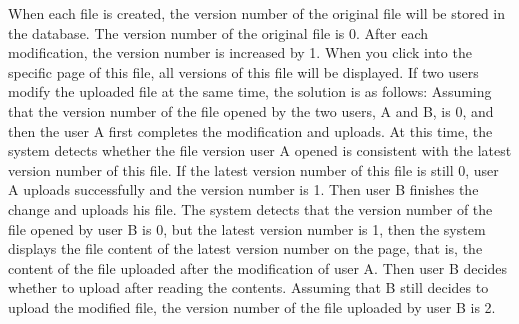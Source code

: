 



\vspace{0.2cm}
\noindent When each file is created, the version number of the original file will be stored in the database. The version number of the original file is 0. After each modification, the version number is increased by 1. When you click into the specific page of this file, all versions of this file will be displayed. If two users modify the uploaded file at the same time, the solution is as follows: Assuming that the version number of the file opened by the two users, A and B, is 0, and then the user A first completes the modification and uploads. At this time, the system detects whether the file version user A opened is consistent with the latest version number of this file. If the latest version number of this file is still 0, user A uploads successfully and the version number is 1. Then user B finishes the change and uploads his file. The system detects that the version number of the file opened by user B is 0, but the latest version number is 1, then the system displays the file content of the latest version number on the page, that is, the content of  the file uploaded after the modification of user A. Then user B decides whether to upload after reading the contents. Assuming that B still decides to upload the modified file, the version number of the file uploaded by user B is 2.

